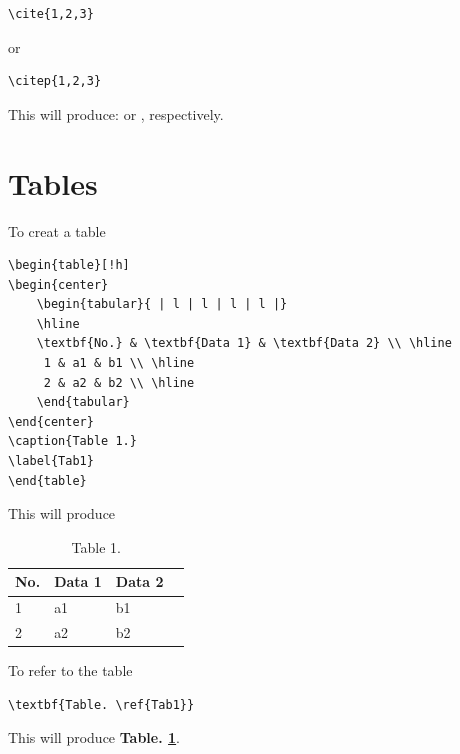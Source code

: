 \begin{verbatim}
\cite{1,2,3}
\end{verbatim}
or
\begin{verbatim}
\citep{1,2,3}
\end{verbatim}

\noindent This will produce: \cite{1,2,3} or \citep{1,2,3}, respectively.

\section{Tables}

To creat a table

\begin{verbatim}
\begin{table}[!h]
\begin{center}
    \begin{tabular}{ | l | l | l | l |}
    \hline
    \textbf{No.} & \textbf{Data 1} & \textbf{Data 2} \\ \hline
     1 & a1 & b1 \\ \hline
     2 & a2 & b2 \\ \hline
    \end{tabular}
\end{center}
\caption{Table 1.}
\label{Tab1}
\end{table}
\end{verbatim}

\noindent This will produce

\begin{table}[!h]
\begin{center}
    \begin{tabular}{ | l | l | l | l |}
    \hline
    \textbf{No.} & \textbf{Data 1} & \textbf{Data 2} \\ \hline
     1 & a1 & b1 \\ \hline
     2 & a2 & b2 \\ \hline
    \end{tabular}
\end{center}
\caption{Table 1.}
\label{Tab1}
\end{table}

\noindent To refer to the table

\begin{verbatim}
\textbf{Table. \ref{Tab1}}
\end{verbatim}

\noindent This will produce \textbf{Table. \ref{Tab1}}.

\cleardoublepage